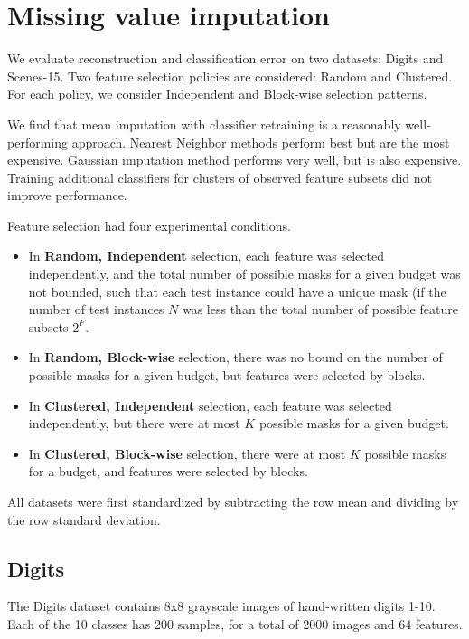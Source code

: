\chapter{Missing value imputation}\label{sec:imputation_evaluation}

We evaluate reconstruction and classification error on two datasets: Digits and Scenes-15.
Two feature selection policies are considered: Random and Clustered.
For each policy, we consider Independent and Block-wise selection patterns.

We find that mean imputation with classifier retraining is a reasonably well-performing approach.
Nearest Neighbor methods perform best but are the most expensive.
Gaussian imputation method performs very well, but is also expensive.
Training additional classifiers for clusters of observed feature subsets did not improve performance.

Feature selection had four experimental conditions.
\begin{itemize}
\item In \textbf{Random, Independent} selection, each feature was selected independently, and the total number of possible masks for a given budget was not bounded, such that each test instance could have a unique mask (if the number of test instances $N$ was less than the total number of possible feature subsets $2^F$.
\item In \textbf{Random, Block-wise} selection, there was no bound on the number of possible masks for a given budget, but features were selected by blocks.
\item In \textbf{Clustered, Independent} selection, each feature was selected independently, but there were at most $K$ possible masks for a given budget.
\item In \textbf{Clustered, Block-wise} selection, there were at most $K$ possible masks for a budget, and features were selected by blocks.
\end{itemize}

All datasets were first standardized by subtracting the row mean and dividing by the row standard deviation.

\section{Digits}
The Digits dataset contains 8x8 grayscale images of hand-written digits 1-10.
Each of the 10 classes has 200 samples, for a total of 2000 images and 64 features.

